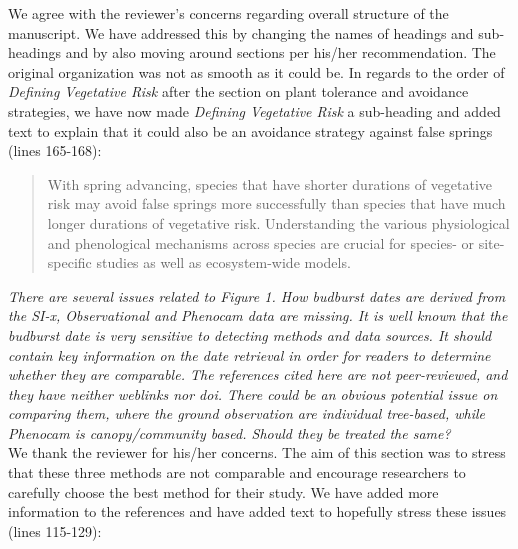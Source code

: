 \documentclass[11pt,a4paper]{article}
\begin{document}
We agree with the reviewer's concerns regarding overall structure of the manuscript. We have addressed this by changing the names of headings and sub-headings and by also moving around sections per his/her recommendation. The original organization was not as smooth as it could be. In regards to the order of \textit{Defining Vegetative Risk} after the section on plant tolerance and avoidance strategies, we have now made \textit{Defining Vegetative Risk} a sub-heading and added text to explain that it could also be an avoidance strategy against false springs (lines 165-168): \\

\begin{quotation}
With spring advancing, species that have shorter durations of vegetative risk may avoid false springs more successfully than species that have much longer durations of vegetative risk. Understanding the various physiological and phenological mechanisms across species are crucial for species- or site-specific studies as well as ecosystem-wide models.
\end{quotation}

\textit{There are several issues related to Figure 1. How budburst dates are derived from the SI-x, Observational and Phenocam data are missing. It is well known that the budburst date is very sensitive to detecting methods and data sources. It should contain key information on the date retrieval in order for readers to determine whether they are comparable. The references cited here are not peer-reviewed, and they have neither weblinks nor doi. There could be an obvious potential issue on comparing them, where the ground observation are individual tree-based, while Phenocam is canopy/community based. Should they be treated the same?} \\

We thank the reviewer for his/her concerns. The aim of this section was to stress that these three methods are not comparable and encourage researchers to carefully choose the best method for their study. We have added more information to the references and have added text to hopefully stress these issues (lines 115-129):
\end{document}
